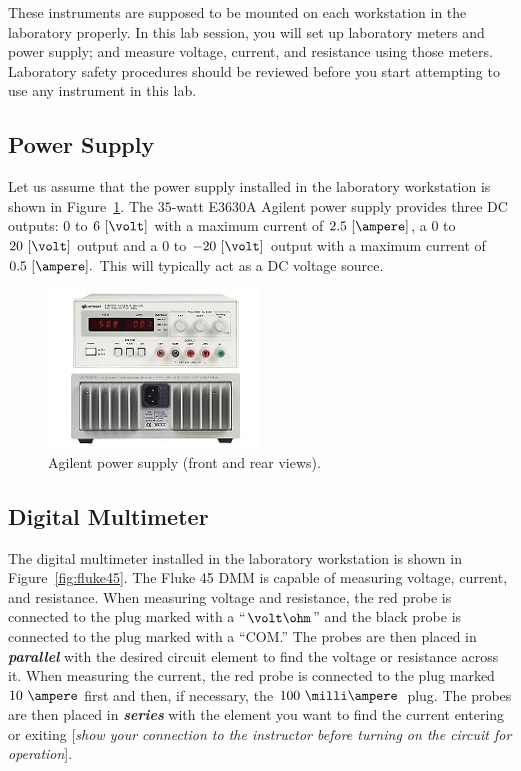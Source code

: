 These instruments are supposed to be mounted on each workstation in the
laboratory properly. In
this lab session, you will set up laboratory meters and power supply; and
measure voltage, current, and resistance using those meters. Laboratory safety
procedures should be reviewed before you start attempting to use any instrument
in this lab.


\subsection{Power Supply}
\label{sec:powerSupply}

Let us assume that the power supply installed in the laboratory workstation is shown in Figure~\ref{fig:agilentE3630A-PowerSupply}. The $35$-watt E3630A Agilent power supply provides three DC outputs: $0$ to $6 ~[\volt]$ with a maximum current of $2.5~[\ampere]$, a $0$ to $20~[\volt]$ output and a $0$ to $-20~[\volt]$ output with a maximum current of $0.5~[\ampere].$ This will typically act as a DC voltage source.%
%
\begin{figure}[h]
   \centering
   \includegraphics[width=0.5\textwidth]{figs/img/labs/agilentE3630A-PowerSupply.jpg}
   \caption{Agilent power supply (front and rear views).}
   \label{fig:agilentE3630A-PowerSupply}
\end{figure}
%

\subsection{Digital Multimeter}
\label{sec:digital-multimeter}

The digital multimeter installed in the laboratory workstation is shown in
Figure~\ref{fig:fluke45}. The Fluke 45 DMM is capable of measuring voltage,
current, and resistance. When measuring voltage and resistance, the red probe is
connected to the plug marked with a ``$\volt\ohm$'' and the black probe is
connected to the plug marked with a ``COM.'' The probes are then placed in
\emph{{\bf parallel}} with the desired circuit element to find the voltage or
resistance across it. When measuring the current, the red probe is connected to
the plug marked $10~\ampere$ first and then, if necessary, the
$100~\milli\ampere$~plug. The probes are then placed in \emph{{\bf series}} with
the element you want to find the current entering or exiting [\emph{show your
  connection to the instructor before turning on the circuit for operation}].


